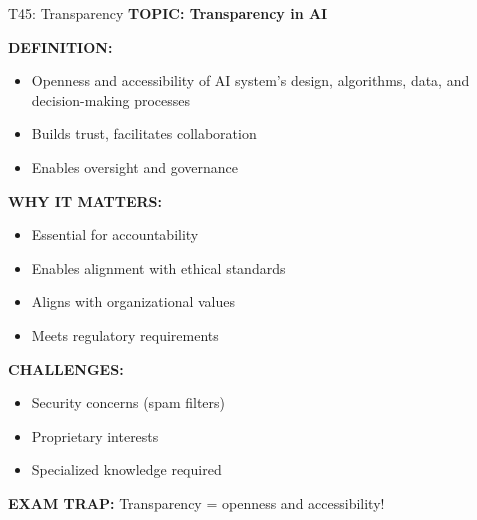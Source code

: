 \documentclass[8pt]{beamer}
\begin{document}
	\begin{frame}{T45: Transparency}
		\fontsize{6.5}{7.5}\selectfont
		\textbf{TOPIC: Transparency in AI}
		
		\vspace{0.1cm}
		\textbf{DEFINITION:}
		\begin{itemize}
			\item Openness and accessibility of AI system's design, algorithms, data, and decision-making processes
			\item Builds trust, facilitates collaboration
			\item Enables oversight and governance
		\end{itemize}
		
		\vspace{0.1cm}
		\textbf{WHY IT MATTERS:}
		\begin{itemize}
			\item Essential for accountability
			\item Enables alignment with ethical standards
			\item Aligns with organizational values
			\item Meets regulatory requirements
		\end{itemize}
		
		\vspace{0.1cm}
		\textbf{CHALLENGES:}
		\begin{itemize}
			\item Security concerns (spam filters)
			\item Proprietary interests
			\item Specialized knowledge required
		\end{itemize}
		
		\textcolor{myred}{\textbf{EXAM TRAP:}} Transparency = \textcolor{myblue}{openness and accessibility}!
	\end{frame}
	
\end{document}
